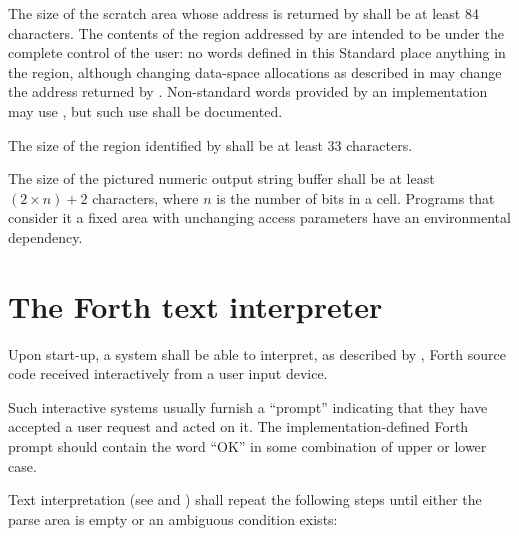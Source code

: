 The size of the scratch area whose address is returned by 
shall be at least 84 characters. The contents of the region
addressed by  are intended to be under the complete
control of the user: no words defined in this Standard place
anything in the region, although changing data-space allocations as
described in  may change
the address returned by . Non-standard words provided by
an implementation may use , but such use shall be
documented.

The size of the region identified by  shall be at least
33 characters.

The size of the pictured numeric output string buffer shall be at
least $(2 \times n) + 2 $ characters, where $n$ is the number of
bits in a cell. Programs that consider it a fixed area with
unchanging access parameters have an environmental dependency.

\section{The Forth text interpreter} %
\label{usage:command}

Upon start-up, a system shall be able to interpret, as described
by , Forth source code received interactively
from a user input device.

Such interactive systems usually furnish a ``prompt'' indicating
that they have accepted a user request and acted on it. The
imple\-mentation-defined Forth prompt should contain the word ``OK''
in some combination of upper or lower case.

Text interpretation (see  and
) shall repeat the following steps until
either the parse area is empty or an ambiguous condition exists:

